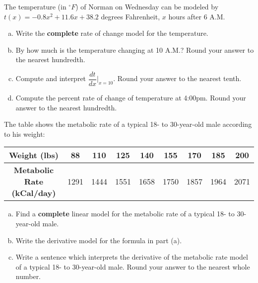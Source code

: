 \documentclass[notes]{subfiles}
\begin{document}
		\begin{ex}
			The temperature (in $^\circ F$) of Norman on Wednesday can be modeled by $t(x) = -0.8x^2+11.6x+38.2$ degrees Fahrenheit, $x$ hours after 6 A.M.
			\begin{enumerate}[(a)]
				\item Write the \textbf{complete} rate of change model for the temperature.  
 				\item By how much is the temperature changing at 10 A.M.?  Round your answer to the nearest hundredth.  
 				\item Compute and interpret $\dfrac{dt}{dx}\bigg|_{x = 10}$. Round your answer to the nearest tenth.  
 				\item Compute the percent rate of change of temperature at 4:00pm.  Round your answer to the nearest hundredth.  
 			\end{enumerate}
 		\end{ex}
 			\newpage
 			
		\begin{ex}
			The table shows the metabolic rate of a typical 18- to 30-year-old male according to his weight:
			\begin{center}
				{\renewcommand{\arraystretch}{1.2}
				\begin{tabular}{|c|c|c|c|c|c|c|c|c|}\hline
					\textbf{Weight (lbs)} & 88 & 110 & 125 & 140 & 155 & 170 & 185 & 200 \\ \hline
					\textbf{Metabolic Rate (kCal/day)} & 1291 & 1444 & 1551 & 1658 & 1750 & 1857 & 1964 & 2071\\ \hline
				\end{tabular}
				}
			\end{center}
			\begin{enumerate}[(a)]
				\item Find a \textbf{complete} linear model for the metabolic rate of a typical 18- to 30-year-old male. 
					\vs{1}
				\item Write the derivative model for the formula in part (a).  
					\vs{1}
 				\item Write a sentence which interprets the derivative of the metabolic rate model of a typical 18- to 30-year-old male.  Round your answer to the nearest whole number.  
 					\vs{1}
 			\end{enumerate}
 		\end{ex}
	\clearpage
\end{document}
